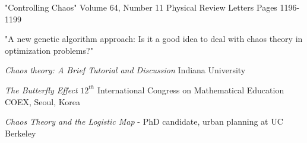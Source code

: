 \documentclass[DIV=calc, paper=a4, fontsize=11pt, twocolumn]{scrartcl}	 %
\begin{document}
\begin{thebibliography}{99} %

\newblock "Controlling Chaos" Volume 64, Number 11 Physical Review Letters
\newblock  Pages 1196-1199

\newblock "A new genetic algorithm approach: Is it a good
idea to deal with chaos theory in optimization
problems?"
  
\newblock \emph{Chaos theory: A Brief Tutorial and Discussion} Indiana University

\newblock \emph{The Butterfly Effect} $12^{th}$ International Congress on Mathematical Education
COEX, Seoul, Korea
 
\newblock \emph{Chaos Theory and the Logistic Map} - PhD candidate, urban planning at UC Berkeley
\end{thebibliography}

\end{document}

